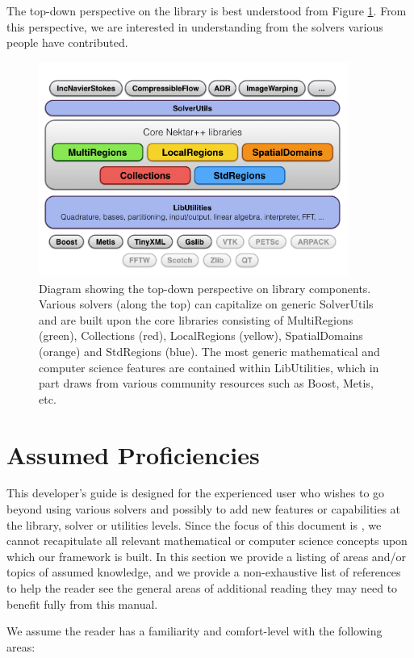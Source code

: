 The top-down perspective on the library is best understood from Figure \ref{intro:structure2}.  From this perspective, we are interested in understanding 
{\nek} from the solvers various people have contributed.  

\begin{figure}[htb]
\centering
\includegraphics[width=4in]{img/structure2.png}
\caption{Diagram showing the top-down perspective on library components.  Various solvers (along the top) can capitalize on generic SolverUtils and are built upon
the core {\nek} libraries consisting of MultiRegions (green), Collections (red), LocalRegions (yellow), SpatialDomains (orange) and StdRegions (blue).  The most 
generic mathematical and computer science features are contained within LibUtilities, which in part draws from various community resources such as Boost, Metis, etc.}
\label{intro:structure2}
\end{figure}


\section{Assumed Proficiencies}

This developer's guide is designed for the experienced \shp{} user who wishes to go beyond
using various \nek{} solvers and possibly to add new features or capabilities at the library,
solver or utilities levels.  Since the focus of this document is \nek{}, we cannot 
recapitulate all relevant mathematical or computer science concepts upon which our
framework is built.  In this section we provide a listing of areas and/or topics of 
assumed knowledge, and we provide a non-exhaustive list of references to help
the reader see the general areas of additional reading they may need to benefit fully
from this manual.

We assume the reader has a familiarity and comfort-level with the following areas:

